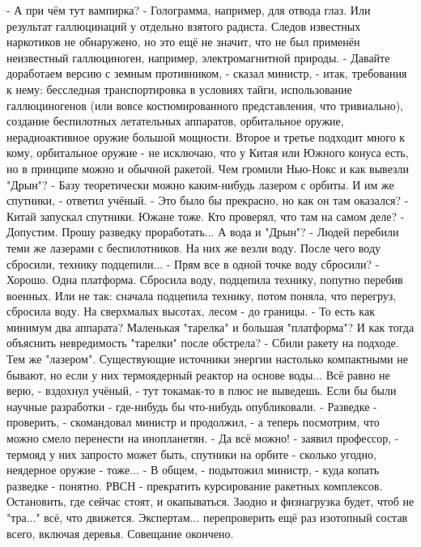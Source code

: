  - А при чём тут вампирка?
 - Голограмма, например, для отвода глаз. Или результат галлюцинаций у отдельно взятого радиста. Следов известных наркотиков не обнаружено, но это ещё не значит, что не был применён неизвестный галлюциноген, например, электромагнитной природы.
 - Давайте доработаем версию с земным противником, - сказал министр, - итак, требования к нему: бесследная транспортировка в условиях тайги, использование галлюциногенов (или вовсе костюмированного представления, что тривиально), создание беспилотных летательных аппаратов, орбитальное оружие, нерадиоактивное оружие большой мощности. Второе и третье подходит много к кому, орбитальное оружие - не исключаю, что у Китая или Южного конуса есть, но в принципе можно и обычной ракетой. Чем громили Нью-Нокс и как вывезли "Дрын"?
 - Базу теоретически можно каким-нибудь лазером с орбиты. И им же спутники, - ответил учёный.
 - Это было бы прекрасно, но как он там оказался?
 - Китай запускал спутники. Южане тоже. Кто проверял, что там на самом деле?
 - Допустим. Прошу разведку проработать... А вода и "Дрын"?
 - Людей перебили теми же лазерами с беспилотников. На них же везли воду. После чего воду сбросили, технику подцепили...
 - Прям все в одной точке воду сбросили?
 - Хорошо. Одна платформа. Сбросила воду, подцепила технику, попутно перебив военных. Или не так: сначала подцепила технику, потом поняла, что перегруз, сбросила воду. На сверхмалых высотах, лесом - до границы.
 - То есть как минимум два аппарата? Маленькая "тарелка" и большая "платформа"? И как тогда объяснить невредимость "тарелки" после обстрела?
 - Сбили ракету на подходе. Тем же "лазером". Существующие источники энергии настолько компактными не бывают, но если у них термоядерный реактор на основе воды... Всё равно не верю, - вздохнул учёный, - тут токамак-то в плюс не выведешь. Если бы были научные разработки - где-нибудь бы что-нибудь опубликовали.
 - Разведке - проверить, - скомандовал министр и продолжил, - а теперь посмотрим, что можно смело перенести на инопланетян.
 - Да всё можно! - заявил профессор, - термояд у них запросто может быть, спутники на орбите - сколько угодно, неядерное оружие - тоже...
 - В общем, - подытожил министр, - куда копать разведке - понятно. РВСН - прекратить курсирование ракетных комплексов. Остановить, где сейчас стоят, и окапываться. Заодно и физнагрузка будет, чтоб не "тра..." всё, что движется. Экспертам... перепроверить ещё раз изотопный состав всего, включая деревья. Совещание окончено.
